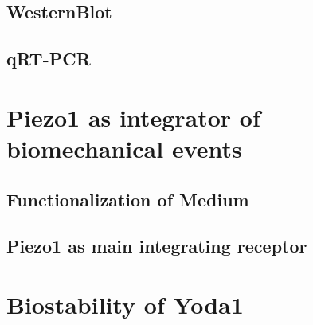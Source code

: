 \subsection{WesternBlot}
\subsection{qRT-PCR}

\section{Piezo1 as integrator of biomechanical events}
\subsection{Functionalization of Medium}
\subsection{Piezo1 as main integrating receptor}

\section{Biostability of Yoda1}
\kant[42][1-3]